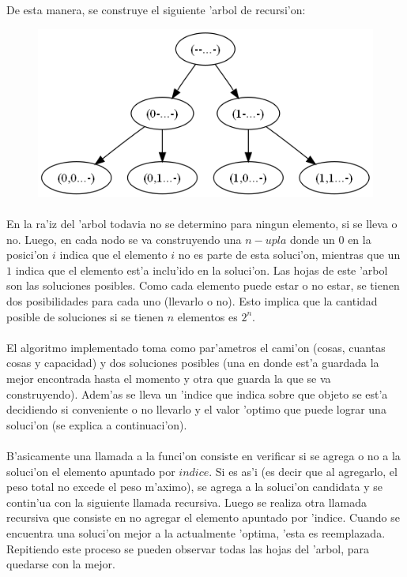 De esta manera, se construye el siguiente 'arbol de recursi'on:\\
\begin{figure}[H]
\centering
\includegraphics[scale=0.5]{./ejercicio2/arbol.png}
\end{figure}

\paragraph{}
En la ra'iz del 'arbol todavia no se determino para ningun elemento, si se lleva o no. Luego, en cada nodo se va construyendo una $n-upla$ donde un $0$ en la posici'on $i$ 
indica que el elemento $i$ no es parte de esta soluci'on, mientras que  un $1$ indica que el elemento est'a inclu'ido en la soluci'on.
Las hojas de este 'arbol son las soluciones posibles. Como cada elemento puede estar o no estar, se tienen dos posibilidades para cada
uno (llevarlo o no). Esto implica que la cantidad posible de soluciones si se tienen $n$ elementos es $2^n$.
\paragraph{}
El algoritmo implementado toma como par'ametros el cami'on (cosas, cuantas cosas y capacidad)  y dos soluciones posibles (una en donde est'a guardada la mejor 
encontrada hasta el momento y otra que guarda la que se va construyendo). Adem'as se lleva un 'indice que 
indica sobre que objeto se est'a decidiendo si conveniente o no llevarlo y el valor 'optimo que puede lograr una soluci'on
(se explica a continuaci'on).
\paragraph{}
B'asicamente una llamada a la funci'on consiste en verificar si se agrega o no a la soluci'on el elemento apuntado por $indice$. Si es as'i (es 
decir que al agregarlo, el peso total no excede el peso m'aximo), se agrega a la soluci'on candidata y se contin'ua con la 
siguiente llamada recursiva. Luego se realiza otra llamada recursiva que consiste en no agregar el elemento apuntado por 'indice. Cuando se encuentra 
una soluci'on mejor a la actualmente 'optima, 'esta es reemplazada. Repitiendo este proceso se pueden observar todas 
las hojas del 'arbol, para quedarse con la mejor.
